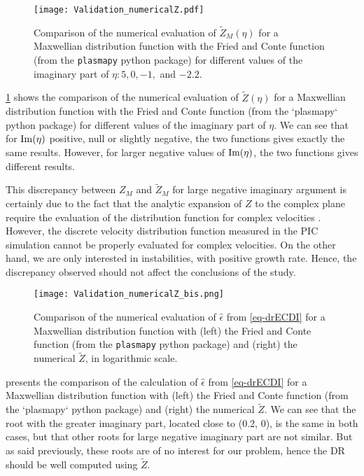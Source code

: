   \begin{figure}[!hbt]
    \centering
    \texttt{[image: Validation\_numericalZ.pdf]}
    \caption{Comparison of the numerical evaluation of $\tilde{Z}_M(\eta)$ for a Maxwellian distribution function with the Fried and Conte function (from the \texttt{plasmapy} python package) for different values of the imaginary part of $\eta: 5, 0,-1,$ and $-2.2$.  }
    \label{fig-numZ}
  \end{figure}
  \cref{fig-numZ} shows the comparison of the numerical evaluation of $\tilde{Z}(\eta)$ for a Maxwellian distribution function with the Fried and Conte function (from the `plasmapy` python package) for different values of the imaginary part of $\eta$.
  We can see that for ${\rm Im}(\eta)$ positive, null or slightly negative, the two functions gives exactly the same results.
  However, for larger negative values of ${\rm Im}(\eta)$, the two functions gives different results.
  
  This discrepancy between $Z_M$ and $\tilde{Z}_M$ for large negative imaginary argument is certainly due to the fact that the analytic expansion of $Z$ to the complex plane require the evaluation of the distribution function for complex velocities \citep{xie2013,weideman1995}.
  However, the discrete velocity distribution function measured in the \ac{PIC} simulation cannot be properly evaluated for complex velocities.
  On the other hand, we are only interested in instabilities, with positive growth rate.
  Hence, the discrepancy observed should not affect the conclusions of the study.
  


  \begin{figure}[hbt]
    \centering
    \texttt{[image: Validation\_numericalZ\_bis.png]}
    \caption{Comparison of the numerical evaluation of $\hat\epsilon$ from \cref{eq-drECDI} for a Maxwellian distribution function with (left) the Fried and Conte function (from the \texttt{plasmapy} python package) and (right) the numerical $\tilde{Z}$, in logarithmic scale.  }
    \label{fig-numZbis}
  \end{figure}
  
   presents the comparison of the calculation of $\hat\epsilon$ from \cref{eq-drECDI} for a Maxwellian distribution function with (left) the Fried and Conte function (from the `plasmapy` python package) and (right) the numerical $\tilde{Z}$.
  We can see that the root with the greater imaginary part, located close to (0.2, 0), is the same in both cases, but that other roots for large negative imaginary part are not similar.
  But as said previously, these roots are of no interest for our problem, hence the \ac{DR} should be well computed using $\tilde{Z}$.
  

